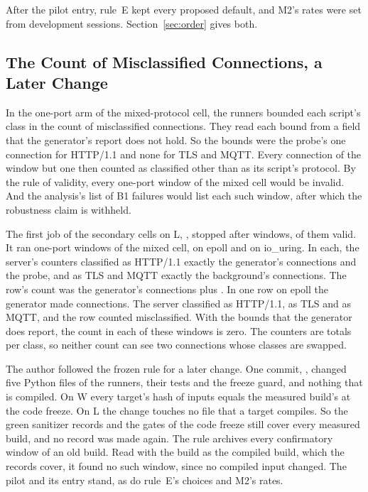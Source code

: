After the pilot entry, rule~E kept every proposed default, and M2's rates were set from development
sessions. Section~\ref{sec:order} gives both.

\subsection{The Count of Misclassified Connections, a Later Change}\label{sec:dev-b1}

 In the one-port arm of the mixed-protocol cell, the runners bounded each
script's class in the count of misclassified connections. They read each bound from a field that
the generator's report does not hold. So the bounds were the probe's one connection for HTTP/1.1
and none for TLS and MQTT. Every connection of the window but one then counted as classified other
than as its script's protocol. By the rule of validity, every one-port window of the mixed cell
would be invalid. And the analysis's list of B1 failures would list each such window, after which
the robustness claim is withheld.

 The first job of the secondary cells on L, \JobSlOne{}, stopped after
\SlOneWindows{} windows, \SlOneValid{} of them valid. It ran \SlOneMixed{} one-port windows of the
mixed cell, \SlOneMixedEpoll{} on epoll and \SlOneMixedIouring{} on io\_uring. In each, the server's
counters classified as HTTP/1.1 exactly the generator's connections and the probe, and as TLS and
MQTT exactly the background's connections. The row's count was the generator's connections plus
\SlOneExtra. In one row on epoll the generator made \SlOneConnectsRun{} connections. The server
classified \SlOneClassifiedHttp{} as HTTP/1.1, \SlOneClassifiedTls{} as TLS and
\SlOneClassifiedMqtt{} as MQTT, and the row counted \SlOneMisclassified{} misclassified. With the
bounds that the generator does report, the count in each of these windows is zero. The counters
are totals per class, so neither count can see two connections whose classes are swapped.

 The author followed the frozen rule for a later change. One commit,
\hex{\ChangeCommit}, changed five Python files of the runners, their tests and the freeze guard,
and nothing that is compiled. On W every target's hash of inputs equals the measured build's at the
code freeze. On L the change touches no file that a target compiles. So the green sanitizer
records and the gates of the code freeze still cover every measured build, and no record was made
again. The rule archives every confirmatory window of an old build. Read with the build as the
compiled build, which the records cover, it found no such window, since no compiled input changed.
The pilot and its entry stand, as do rule~E's choices and M2's rates.


